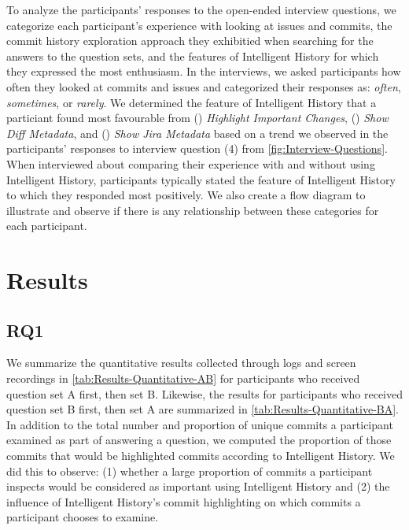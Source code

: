 To analyze the participants' responses to the open-ended interview questions, 
we categorize each participant's experience with looking at issues and commits,
the commit history exploration approach they exhibitied when searching for the answers to the question sets, 
and the features of Intelligent History for which they expressed the most enthusiasm.
In the interviews, we asked participants how often they looked at commits and issues 
and categorized their responses as: 
\textit{often}, \textit{sometimes}, or \textit{rarely}.
We determined the feature of Intelligent History that a particiant found most favourable from
() \textit{Highlight Important Changes}, 
() \textit{Show Diff Metadata}, and
() \textit{Show Jira Metadata}
based on a trend we observed in the participants' responses to interview question (4) from \autoref{fig:Interview-Questions}.
When interviewed about comparing their experience with and without using Intelligent History,
participants typically stated the feature of Intelligent History to which they responded most positively.
We also create a flow diagram to illustrate and observe if there is any 
relationship between these categories for each participant.

\section{Results}
\label{sec:Results}

\subsection{RQ1}
\label{subsec:RQ1}


We summarize the quantitative results collected through logs and screen recordings in \autoref{tab:Results-Quantitative-AB} 
for participants who received question set A first, then set B.
Likewise, the results for participants who received question set B first, then set A are summarized in \autoref{tab:Results-Quantitative-BA}.
In addition to the total number and proportion of unique commits a participant examined as part of answering a question,
we computed the proportion of those commits that would be highlighted commits according to Intelligent History.
We did this to observe:
(1) whether a large proportion of commits a participant inspects would be considered as important using Intelligent History
and (2) the influence of Intelligent History's commit highlighting on which commits a participant chooses to examine.

